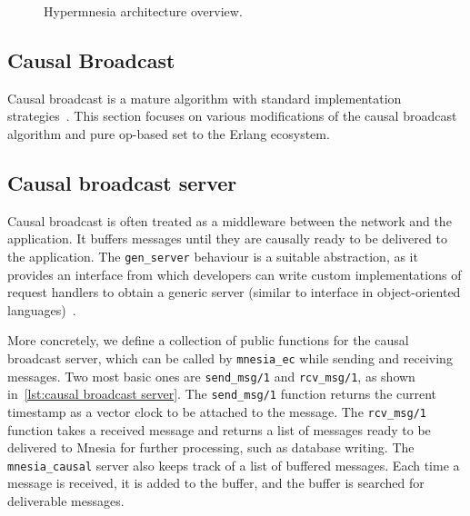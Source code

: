 \begin{figure*}[htp]
  \caption{Hypermnesia architecture overview.}
  \label{fig:hypermnesia arch}
\end{figure*}


\subsection{Causal Broadcast} \label{sec:impl cbcast}

Causal broadcast is a mature algorithm with standard implementation 
strategies~\cite{schmuck1988broadcast,birman1991causal}. This section focuses on various
modifications of the causal broadcast algorithm and pure op-based set 
to the Erlang ecosystem.

\subsection{Causal broadcast server}

Causal broadcast is often treated as a middleware between the
network and the application. It buffers messages until they are causally ready
to be delivered to the application. The \texttt{gen_server} behaviour
is a suitable abstraction, as it provides an interface from which
developers can write custom implementations of request handlers to obtain a
generic server (similar to interface in object-oriented 
languages)~\cite{ericssonab2023otpdesign}.

More concretely, we define a collection of public functions for the causal broadcast
server, which can be called by \texttt{mnesia_ec} while sending
and receiving messages. Two most basic ones are \texttt{send_msg/1}
and \texttt{rcv_msg/1}, as shown in~\cref{lst:causal broadcast server}.
The \texttt{send_msg/1} function returns the current timestamp
as a vector clock to be attached to the message.  The \texttt{rcv_msg/1}
function takes a received message and returns a list of messages ready to be
delivered to Mnesia for further processing, such as database writing.
The \verb|mnesia_causal| server also keeps track of a list of buffered messages.
Each time a message is received, it is added to the buffer, and the buffer is
searched for deliverable messages.


